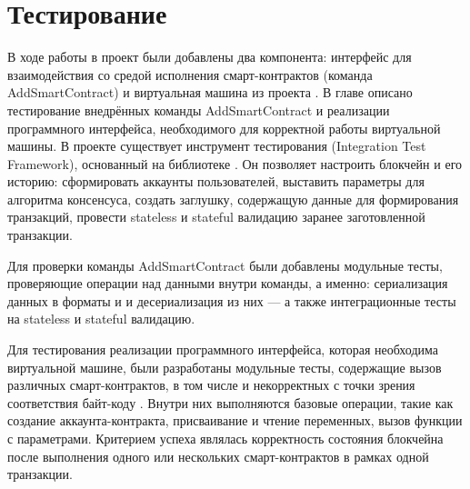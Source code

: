 \section{Тестирование}
В ходе работы в проект были добавлены два компонента: интерфейс для взаимодействия со средой исполнения смарт-контрактов (команда AddSmartContract) и виртуальная машина из проекта .
В главе описано тестирование внедрённых команды AddSmartContract и реализации программного интерфейса, необходимого для корректной работы виртуальной машины.
В проекте  существует инструмент тестирования  (Integration Test Fra\-me\-work), основанный на библиотеке .
Он позволяет настроить блокчейн и его историю: сформировать аккаунты пользователей, выставить параметры для алгоритма консенсуса, создать заглушку, содержащую данные для формирования транзакций, провести stateless и stateful валидацию заранее заготовленной транзакции.

Для проверки команды Add\-Smart\-Con\-tract были добавлены модульные тесты, проверяющие операции над данными внутри команды, а именно: сериализация данных в форматы  и  и десериализация из них --- а также интеграционные тесты на stateless и stateful валидацию.

Для тестирования реализации программного интерфейса, которая необходима виртуальной машине, были разработаны модульные тесты, содержащие вызов различных смарт-контрактов, в том числе и некорректных с точки зрения соответствия байт-коду .
Внутри них выполняются базовые операции, такие как создание аккаунта-контракта, присваивание и чтение переменных, вызов функции с параметрами.
Критерием успеха являлась корректность состояния блокчейна после выполнения одного или нескольких смарт-контрактов в рамках одной транзакции.
